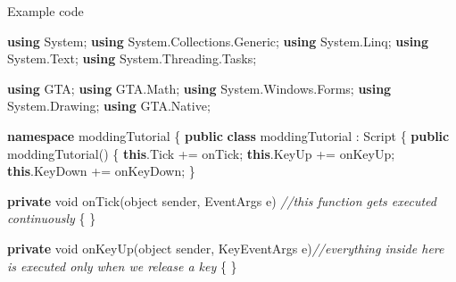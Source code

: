 \documentclass[
  openany]{book}
\newenvironment{Shaded}{\begin{snugshade}}{\end{snugshade}}
\newcommand{\CommentTok}[1]{\textcolor[rgb]{0.56,0.35,0.01}{\textit{#1}}}
\newcommand{\DataTypeTok}[1]{\textcolor[rgb]{0.13,0.29,0.53}{#1}}
\newcommand{\FunctionTok}[1]{\textcolor[rgb]{0.00,0.00,0.00}{#1}}
\newcommand{\KeywordTok}[1]{\textcolor[rgb]{0.13,0.29,0.53}{\textbf{#1}}}
\newcommand{\NormalTok}[1]{#1}
\begin{document}
Example code

\begin{Shaded}
\begin{Highlighting}[]
\KeywordTok{using}\NormalTok{ System;}
\KeywordTok{using}\NormalTok{ System.}\FunctionTok{Collections}\NormalTok{.}\FunctionTok{Generic}\NormalTok{;}
\KeywordTok{using}\NormalTok{ System.}\FunctionTok{Linq}\NormalTok{;}
\KeywordTok{using}\NormalTok{ System.}\FunctionTok{Text}\NormalTok{;}
\KeywordTok{using}\NormalTok{ System.}\FunctionTok{Threading}\NormalTok{.}\FunctionTok{Tasks}\NormalTok{;}
 
\KeywordTok{using}\NormalTok{ GTA;}
\KeywordTok{using}\NormalTok{ GTA.}\FunctionTok{Math}\NormalTok{;}
\KeywordTok{using}\NormalTok{ System.}\FunctionTok{Windows}\NormalTok{.}\FunctionTok{Forms}\NormalTok{;}
\KeywordTok{using}\NormalTok{ System.}\FunctionTok{Drawing}\NormalTok{;}
\KeywordTok{using}\NormalTok{ GTA.}\FunctionTok{Native}\NormalTok{;}
 
 
\KeywordTok{namespace}\NormalTok{ moddingTutorial}
\NormalTok{\{}
    \KeywordTok{public} \KeywordTok{class}\NormalTok{ moddingTutorial : Script}
\NormalTok{    \{}
        \KeywordTok{public} \FunctionTok{moddingTutorial}\NormalTok{()}
\NormalTok{        \{}
            \KeywordTok{this}\NormalTok{.}\FunctionTok{Tick}\NormalTok{ += onTick;}
            \KeywordTok{this}\NormalTok{.}\FunctionTok{KeyUp}\NormalTok{ += onKeyUp;}
            \KeywordTok{this}\NormalTok{.}\FunctionTok{KeyDown}\NormalTok{ += onKeyDown;}
\NormalTok{        \}}
 
        \KeywordTok{private} \DataTypeTok{void} \FunctionTok{onTick}\NormalTok{(}\DataTypeTok{object}\NormalTok{ sender, EventArgs e) }\CommentTok{//this function gets executed continuously }
\NormalTok{        \{}
\NormalTok{        \}}
 
        \KeywordTok{private} \DataTypeTok{void} \FunctionTok{onKeyUp}\NormalTok{(}\DataTypeTok{object}\NormalTok{ sender, KeyEventArgs e)}\CommentTok{//everything inside here is executed only when we release a key}
\NormalTok{        \{}
\NormalTok{        \}}
 

\end{Highlighting}
\end{Shaded}
\end{document}
